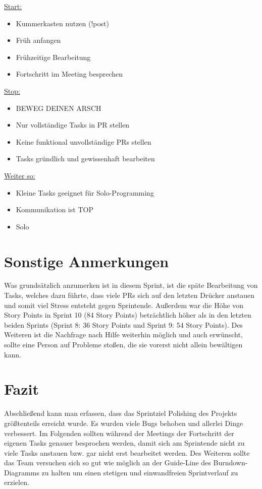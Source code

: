 \documentclass[12pt,a4paper, oneside]{article}
\begin{document}
    \underline{Start:}
    \begin{itemize}
        \item Kummerkasten nutzen (!post)
        \item Früh anfangen
        \item Frühzeitige Bearbeitung
        \item Fortschritt im Meeting besprechen
    \end{itemize}

    \underline{Stop:}
    \begin{itemize}
        \item BEWEG DEINEN ARSCH
        \item Nur vollständige Tasks in PR stellen
        \item Keine funktional unvollständige PRs stellen
        \item Tasks gründlich und gewissenhaft bearbeiten
    \end{itemize}

    \underline{Weiter so:}
    \begin{itemize}
        \item Kleine Tasks geeignet für Solo-Programming
        \item Kommunikation ist TOP
        \item Solo
    \end{itemize}

    \newpage


    \section{Sonstige Anmerkungen}
    Was grundsätzlich anzumerken ist in diesem Sprint, ist die späte Bearbeitung von Tasks, welches dazu führte, dass viele PRs sich auf den letzten Drücker anstauen und somit viel Stress entsteht gegen Sprintende.
    Außerdem war die Höhe von Story Points in Sprint 10 (84 Story Points) beträchtlich höher als in den letzten beiden Sprints (Sprint 8: 36 Story Points und Sprint 9: 54 Story Points).
    Des Weiteren ist die Nachfrage nach Hilfe weiterhin möglich und auch erwünscht, sollte eine Person auf Probleme stoßen, die sie vorerst nicht allein bewältigen kann.

    \section{Fazit}
    Abschließend kann man erfassen, dass das Sprintziel \glqq Polishing des Projekts \grqq{} größtenteils erreicht wurde. Es wurden viele Bugs behoben und allerlei Dinge verbessert. Im Folgenden sollten während der Meetings der Fortschritt der eigenen Tasks genauer besprochen werden, damit sich am Sprintende nicht zu viele Tasks anstauen bzw. gar nicht erst bearbeitet werden. Des Weiteren sollte das Team versuchen sich so gut wie möglich an der Guide-Line des Burndown-Diagramms zu halten um einen stetigen und einwandfreien Sprintverlauf zu erzielen.
\end{document}
